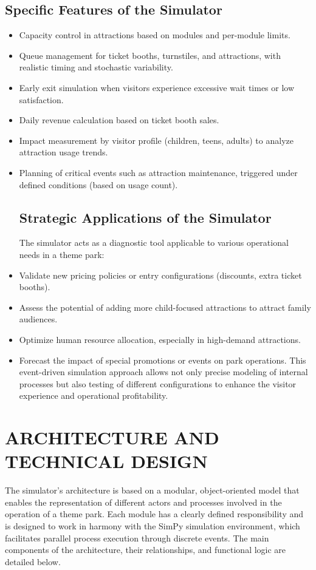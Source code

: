 \documentclass[12pt]{article}
\begin{document}
\subsection{Specific Features of the Simulator}

\begin{itemize}
\item  Capacity control in attractions based on modules and per-module limits.
\item  Queue management for ticket booths, turnstiles, and attractions, with realistic timing and stochastic variability.
\item  Early exit simulation when visitors experience excessive wait times or low satisfaction.
\item  Daily revenue calculation based on ticket booth sales.
\item  Impact measurement by visitor profile (children, teens, adults) to analyze attraction usage trends.
\item  Planning of critical events such as attraction maintenance, triggered under defined conditions (based on usage count).
\subsection{Strategic Applications of the Simulator}
The simulator acts as a diagnostic tool applicable to various operational needs in a theme park:
\item  Validate new pricing policies or entry configurations (discounts, extra ticket booths).
\item  Assess the potential of adding more child-focused attractions to attract family audiences.
\item  Optimize human resource allocation, especially in high-demand attractions.
\item  Forecast the impact of special promotions or events on park operations.
This event-driven simulation approach allows not only precise modeling of internal processes but also testing of different configurations to enhance the visitor experience and operational profitability.
\end{itemize}

\section{ARCHITECTURE AND TECHNICAL DESIGN}
The simulator's architecture is based on a modular, object-oriented model that enables the representation of different actors and processes involved in the operation of a theme park. Each module has a clearly defined responsibility and is designed to work in harmony with the SimPy simulation environment, which facilitates parallel process execution through discrete events.
The main components of the architecture, their relationships, and functional logic are detailed below.
\end{document}
